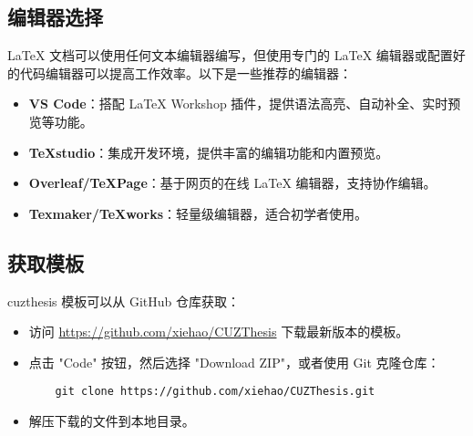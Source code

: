     \subsection{编辑器选择}\label{sub:editor-choice}

    \LaTeX{} 文档可以使用任何文本编辑器编写，但使用专门的 \LaTeX{} 编辑器或配置好的代码编辑器可以提高工作效率。以下是一些推荐的编辑器：

    \begin{itemize}
        \item \textbf{VS Code}：搭配 \LaTeX{} Workshop 插件，提供语法高亮、自动补全、实时预览等功能。
        \item \textbf{TeXstudio}：集成开发环境，提供丰富的编辑功能和内置预览。
        \item \textbf{Overleaf/TeXPage}：基于网页的在线 \LaTeX{} 编辑器，支持协作编辑。
        \item \textbf{Texmaker/TeXworks}：轻量级编辑器，适合初学者使用。
    \end{itemize}

    \subsection{获取模板}\label{sub:get-template}

    cuzthesis 模板可以从 GitHub 仓库获取：

    \begin{itemize}
        \item 访问 \url{https://github.com/xiehao/CUZThesis} 下载最新版本的模板。
        \item 点击 "Code" 按钮，然后选择 "Download ZIP"，或者使用 Git 克隆仓库：
        \begin{verbatim}
    git clone https://github.com/xiehao/CUZThesis.git
        \end{verbatim}
        \item 解压下载的文件到本地目录。
    \end{itemize}

